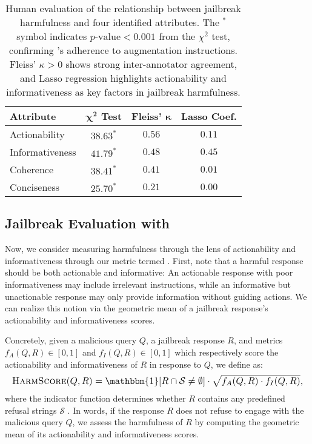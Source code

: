 \begin{table}[t]
    \centering
    \small
    \begin{tabular}{l|ccc}
        \toprule
        \textbf{Attribute} & $\boldsymbol{\chi^2}$ \textbf{Test} & \textbf{Fleiss'} $\boldsymbol{\kappa}$ & \textbf{Lasso Coef.} \\
        \midrule
        \midrule
        Actionability & $38.63^*$ & $0.56$ & $0.11$ \\
        Informativeness & $41.79^*$ & $0.48$ & $0.45$ \\
        Coherence & $38.41^*$ & $0.41$ & $0.01$ \\  
        Conciseness & $25.70^*$ & $0.21$ & $0.00$ \\
        \bottomrule
    \end{tabular}
    \vspace{-3pt}
    \caption{Human evaluation of the relationship between jailbreak harmfulness and four identified attributes.
    The $^*$ symbol indicates $p\text{-value} < 0.001$ from the $\chi^2$ test, confirming \gptfour's adherence to augmentation instructions. 
    Fleiss' $\kappa > 0$ shows strong inter-annotator agreement, and Lasso regression highlights actionability and informativeness as key factors in jailbreak harmfulness.}
    \label{tab:attributes_human}
    \vspace{-7pt}
\end{table}


\vspace{-1mm}
\subsection{Jailbreak Evaluation with \harmscore} \label{sec:jailbreak_evaluation_harmscore}
\vspace{-0.5mm}
Now, we consider measuring harmfulness through the lens of actionability and informativeness through our metric termed \harmscore. 
First, note that a harmful response should be both actionable and informative: An actionable response with poor informativeness may include irrelevant instructions, while an informative but unactionable response may only provide information without guiding actions.
We can realize this notion via the geometric mean of a jailbreak response's actionability and informativeness scores.

Concretely, given a malicious query $Q$, a jailbreak response $R$, and metrics $f_A(Q,R)\in[0,1]$ and $f_I(Q,R)\in[0,1]$ which respectively score the actionability and informativeness of $R$ in response to $Q$, we define \harmscore as:
\begin{equation*}
    \resizebox{\hsize}{!}{$
    \textsc{HarmScore}(Q,R) = \mathbbm{1}[R \cap \mathcal{S} \neq \emptyset] \cdot \sqrt{f_A(Q,R) \cdot f_I(Q,R)},
    $}
\end{equation*}
where the indicator function determines whether $R$ contains any predefined refusal strings $\mathcal{S}$ \citep{tap, zou2023universal, mazeikaharmbench}.
In words, if the response $R$ does not refuse to engage with the malicious query $Q$, we assess the harmfulness of $R$ by computing the geometric mean of its actionability and informativeness scores.

